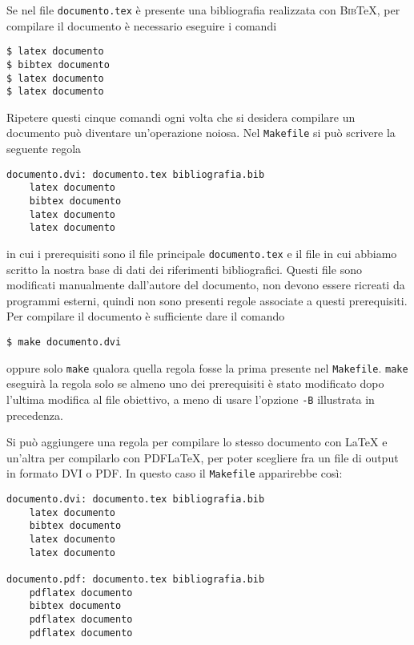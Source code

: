 Se nel file \texttt{documento.tex} è presente una bibliografia realizzata con
\textsc{Bib}\TeX, per compilare il documento è necessario eseguire i comandi
\begin{verbatim}
$ latex documento
$ bibtex documento
$ latex documento
$ latex documento
\end{verbatim}
Ripetere questi cinque comandi ogni volta che si desidera compilare un documento
può diventare un'operazione noiosa.  Nel \texttt{Makefile} si può scrivere la
seguente regola
\begin{lstlisting}
documento.dvi: documento.tex bibliografia.bib
	latex documento
	bibtex documento
	latex documento
	latex documento
\end{lstlisting}
in cui i prerequisiti sono il file principale \texttt{documento.tex} e il file
in cui abbiamo scritto la nostra base di dati dei riferimenti bibliografici.
Questi file sono modificati manualmente dall'autore del documento, non devono
essere ricreati da programmi esterni, quindi non sono presenti regole associate
a questi prerequisiti.  Per compilare il documento è sufficiente dare il comando
\begin{verbatim}
$ make documento.dvi
\end{verbatim} %
oppure solo \texttt{make} qualora quella regola fosse la prima presente nel
\texttt{Makefile}.  \texttt{make} eseguirà la regola solo se almeno uno dei
prerequisiti è stato modificato dopo l'ultima modifica al file obiettivo, a meno
di usare l'opzione \texttt{-B} illustrata in precedenza.

Si può aggiungere una regola per compilare lo stesso documento con \LaTeX{}
e un'altra per compilarlo con \textsc{PDF}\LaTeX, per poter scegliere fra un
file di output in formato \textsc{DVI} o \textsc{PDF}.  In questo caso il
\texttt{Makefile} apparirebbe così:
\begin{lstlisting}[caption={La prima regola permette di compilare un documento con
\LaTeX, la seconda con \textsc{PDF}\LaTeX.},label=lst:dvi-pdf]
documento.dvi: documento.tex bibliografia.bib
	latex documento
	bibtex documento
	latex documento
	latex documento

documento.pdf: documento.tex bibliografia.bib
	pdflatex documento
	bibtex documento
	pdflatex documento
	pdflatex documento
\end{lstlisting}

